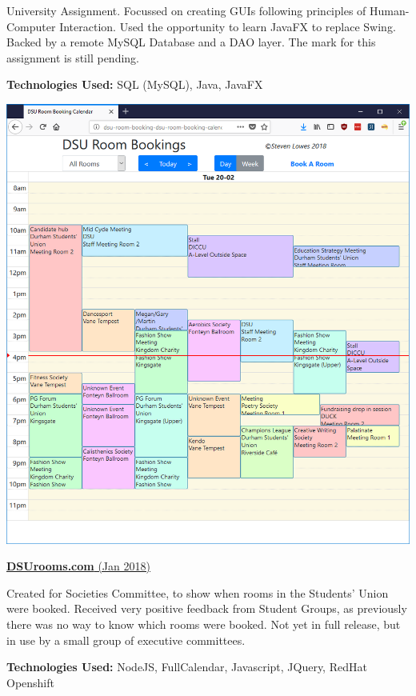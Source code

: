 \documentclass[hidelinks, 12pt, a4paper]{article}
\begin{document}
\begin{minipage}{0.40\textwidth}
		University Assignment. Focussed on creating GUIs following principles of Human-Computer Interaction. Used the opportunity to learn JavaFX to replace Swing. Backed by a remote MySQL Database and a DAO layer. The mark for this assignment is still pending.
		
		\textbf{Technologies Used:} SQL (MySQL), Java, JavaFX
		
	\end{minipage}
	\hspace{0.06\textwidth}
	\begin{minipage}{0.40\textwidth}
		
		\begin{center}
			\href{http://www.dsurooms.com}{\includegraphics[width=0.9\linewidth]{dsurooms.png}}
		\end{center}
		\vspace{-12pt}
		\href{http://www.dsurooms.com}{\textbf{DSUrooms.com} (Jan 2018)}
		
		Created for Societies Committee, to show when rooms in the Students' Union were booked. Received very positive feedback from Student Groups, as previously there was no way to know which rooms were booked. Not yet in full release, but in use by a small group of executive committees.
		
		\textbf{Technologies Used:} NodeJS, FullCalendar, Javascript, JQuery, RedHat Openshift
		

\end{minipage}
\end{document}
